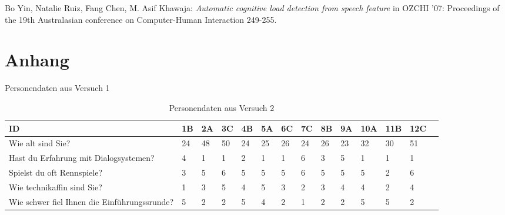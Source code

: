\documentclass[12pt,a4paper]{scrartcl}
\begin{document}
\begin{appendix}
\begin{thebibliography}{Maron \& Ames, 1982}
 Bo Yin, Natalie Ruiz, Fang Chen, M. Asif Khawaja: \textit{Automatic cognitive load detection from speech feature} in OZCHI ’07: Proceedings of the 19th Australasian conference on Computer-Human Interaction 249-255. 






\end{thebibliography}
\newpage




\listoffigures
\cleardoublepage

\listoftables
\cleardoublepage

\section{Anhang}

\begin{table}
\caption{Personendaten aus Versuch 1} \label{Personendaten aus Versuch 1}

\smallskip
\begin{tabular}{|p{6cm}| p{0.6cm} | p{0.6cm} | p{0.6cm} | p{0.6cm} | p{0.6cm} | p{0.6cm} | p{0.6cm} | p{0.6cm} | p{0.6cm} | p{0.6cm} | p{0.6cm} | p{0.6cm} | p{} | }
\hline

	ID & 1B & 2A & 3C & 4B & 5A & 6C & 7C & 8B & 9A & 10A & 11B & 12C \\ \hline \hline
	Wie alt sind Sie? & 24 & 48 & 50 & 24 & 25 & 26 & 24 & 26 & 23 & 32 & 30 & 51 \\ \hline
	Hast du Erfahrung mit Dialogsystemen? & 4 & 1 & 1 & 2 & 1 & 1 & 6 & 3 & 5 & 1 & 1 & 1 \\ \hline
	Spielst du oft Rennspiele? & 3 & 5 & 6 & 5 & 5 & 5 & 6 & 5 & 5 & 5 & 2 & 6 \\ \hline
	Wie technikaffin sind Sie? & 1 & 3 & 5 & 4 & 5 & 3 & 2 & 3 & 4 & 4 & 2 & 4 \\ \hline
	Wie schwer fiel Ihnen die Einführungssrunde? & 5 & 2 & 2 & 5 & 4 & 2 & 1 & 2 & 2 & 5 & 5 & 2 \\ \hline
\end{tabular}

\bigskip\bigskip  %
\caption{Personendaten aus Versuch 2} \label{Personendaten aus Versuch 2}


\end{table}
\end{appendix}
\end{document}
